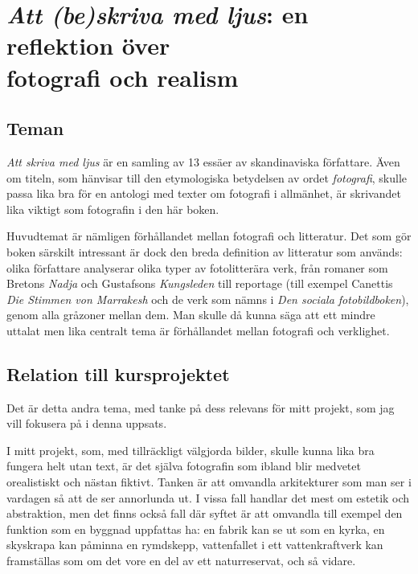 \documentclass[
]{article}
\author{}
\date{}
\begin{document}
\hypertarget{att-beskriva-med-ljus-en-reflektion-uxf6ver-fotografi-och-realism}{%
\section{\texorpdfstring{\emph{Att (be)skriva med ljus}: en reflektion
över \\ fotografi och
realism}{Att (be)skriva med ljus: en reflektion över fotografi och realism}}\label{att-beskriva-med-ljus-en-reflektion-uxf6ver-fotografi-och-realism}}

\hypertarget{teman}{%
\subsection{Teman}\label{teman}}

\emph{Att skriva med ljus} \cite{asml} är en samling av 13 essäer av skandinaviska
författare. Även om titeln, som hänvisar till den etymologiska
betydelsen av ordet \emph{fotografi}, skulle passa lika bra för en
antologi med texter om fotografi i allmänhet, är skrivandet lika viktigt
som fotografin i den här boken.

Huvudtemat är nämligen förhållandet mellan fotografi och litteratur. Det
som gör boken särskilt intressant är dock den breda definition av
litteratur som används: olika författare analyserar olika typer av
fotolitterära verk, från romaner som Bretons \emph{Nadja} och
Gustafsons \emph{Kungsleden} till reportage (till exempel Canettis
\emph{Die Stimmen von Marrakesh} och de verk som nämns i \emph{Den
sociala fotobildboken}), genom alla gråzoner mellan dem. Man skulle då
kunna säga att ett mindre uttalat men lika centralt tema är förhållandet
mellan fotografi och verklighet.

\hypertarget{relation-till-kursprojektet}{%
\subsection{Relation till
kursprojektet}\label{relation-till-kursprojektet}}

Det är detta andra tema, med tanke på dess relevans för mitt projekt,
som jag vill fokusera på i denna uppsats.

I mitt projekt, som, med tillräckligt välgjorda bilder, skulle kunna
lika bra fungera helt utan text, är det själva fotografin som ibland
blir medvetet orealistiskt och nästan fiktivt. Tanken är att omvandla
arkitekturer som man ser i vardagen så att de ser annorlunda ut. I vissa
fall handlar det mest om estetik och abstraktion, men det finns också
fall där syftet är att omvandla till exempel den funktion som en byggnad
uppfattas ha: en fabrik kan se ut som en kyrka, en skyskrapa kan påminna
en rymdskepp, vattenfallet i ett vattenkraftverk kan framställas som om
det vore en del av ett naturreservat, och så vidare.
\end{document}
